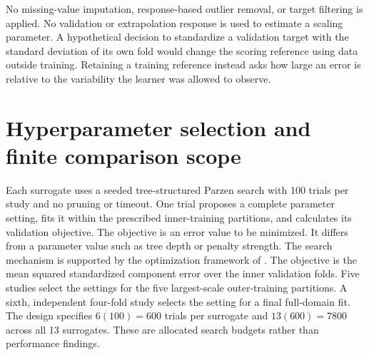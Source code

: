 No missing-value imputation, response-based outlier removal, or target filtering is applied. No validation or extrapolation response is used to estimate a scaling parameter. A hypothetical decision to standardize a validation target with the standard deviation of its own fold would change the scoring reference using data outside training. Retaining a training reference instead asks how large an error is relative to the variability the learner was allowed to observe.

\section{Hyperparameter selection and finite comparison scope}

Each surrogate uses a seeded tree-structured Parzen search with 100 trials per study and no pruning or timeout. One trial proposes a complete parameter setting, fits it within the prescribed inner-training partitions, and calculates its validation objective. The objective is an error value to be minimized. It differs from a parameter value such as tree depth or penalty strength. The search mechanism is supported by the optimization framework of \citet{Akiba2019}. The objective is the mean squared standardized component error over the inner validation folds. Five studies select the settings for the five largest-scale outer-training partitions. A sixth, independent four-fold study selects the setting for a final full-domain fit. The design specifies $6(100)=600$ trials per surrogate and $13(600)=7800$ across all 13 surrogates. These are allocated search budgets rather than performance findings.

